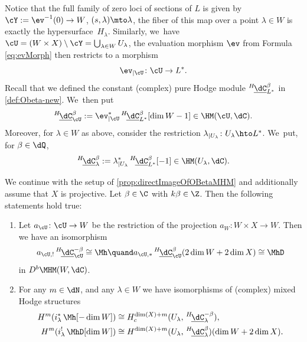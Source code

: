 Notice that the full family of zero loci of sections of $L$ is given by $\cY:=\ev^{-1}(0) \to W$, $(s,\lambda)\mto \lambda$, \ie the fiber of this map over a point $\lambda\in W$ is exactly the hypersurface~$H_\lambda$.
Similarly, we~have
$\cU =(W\times X)\setminus \cY = \bigcup_{\lambda\in W} U_\lambda$, the evaluation morphism $\ev$ from Formula
\eqref{eq:evMorph} then restricts to a morphism
\[
\ev_{|\cU} \colon \cU \to L^*.
\]
Recall that we defined the constant (complex) pure Hodge module $^{H\!}\underline{\dC}^\beta_{L^*}$ in \cref{def:Obeta-new}. We~then put
\[
^{H\!}\underline{\dC}^\beta_{\cU} := {\ev_{|\cU}^*}
\,{^{H\!}}\underline{\dC}^\beta_{L^*}[\dim W -1]
\in\HM(\cU,\dC).
\]
Moreover, for $\lambda\in W$ as above, consider
the restriction $\lambda_{|U_\lambda}\colon U_\lambda
\hto L^*$. We~put, for $\beta\in \dQ$,
\[
{}^{H\!}\underline{\dC}^\beta_\lambda:=\lambda^*_{|U_\lambda}\, ^{H\!}\underline{\dC}^\beta_{L^*}[-1]\in \HM(U_\lambda,\dC).
\]

\begin{prop}\label{prop:TautIsDirectImage} We continue with the setup of \cref{prop:directImageOfOBetaMHM} and additionally assume that $X$ is projective. Let $\beta \in \C$ with $k\beta \in \Z$. Then the following statements hold true:
\begin{enumerate}
\item\label{prop:TautIsDirectImage1}
Let $a_{\cU}\colon \cU\to W$ be the restriction of the projection $a_W\colon W\times X\to W$. Then we have an isomorphism
\[
a_{\cU,!} \, ^{H\!}\underline{\dC}^{-\beta}_{\cU}
\cong \Mh
\quand
a_{\cU,*} \, ^{H\!}\underline{\dC}^{\beta}_{\cU}(2 \dim W + 2\dim X)
\cong \MhD
\]
in $ D^b\MHM(W,\dC)$.
\item\label{prop:TautIsDirectImage2}
For any $m \in \dN$, and any $\lambda\in W$ we have isomorphisms of (complex) mixed Hodge structures
\begin{align*}
H^m(i_\lambda^* \, \Mh[-\dim W]) &\cong H_c^{\dim(X) + m}(U_\lambda,\,^{H\!}\underline{\dC}^{-\beta}_\lambda), \\
H^m(i_\lambda^! \, \MhD[\dim W]) &\cong H^{\dim(X)+m}(U_\lambda,\,^{H\!}\underline{\dC}^{\beta}_\lambda) (\dim W + 2 \dim X). 
\end{align*}
\end{enumerate}
\end{prop}


